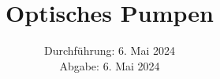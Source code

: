 

\subject{\texorpdfstring{\vspace{2ex}}{}V21\texorpdfstring{\vspace{-2ex}}{}} %
\title{Optisches Pumpen} %
\date{
	Durchführung: 6. Mai 2024 %
	\\ Abgabe: 6. Mai 2024 %
}




\maketitle
\thispagestyle{empty}

\tableofcontents
\newpage









\printbibliography{}

\newpage



